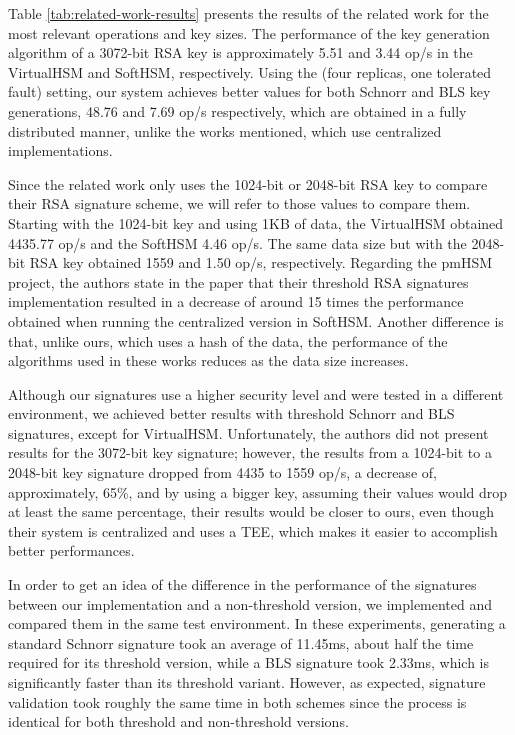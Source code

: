 Table \ref{tab:related-work-results} presents the results of the related work for the most relevant operations and key sizes. The performance of the key generation algorithm of a 3072-bit RSA key is approximately 5.51 and 3.44 op/s in the VirtualHSM and SoftHSM, respectively. Using the (four replicas, one tolerated fault) setting, our system achieves better values for both Schnorr and BLS key generations, 48.76 and 7.69 op/s respectively, which are obtained in a fully distributed manner, unlike the works mentioned, which use centralized implementations.

Since the related work only uses the 1024-bit or 2048-bit RSA key to compare their RSA signature scheme, we will refer to those values to compare them. Starting with the 1024-bit key and using 1KB of data, the VirtualHSM obtained 4435.77 op/s and the SoftHSM 4.46 op/s. The same data size but with the 2048-bit RSA key obtained 1559 and 1.50 op/s, respectively. 
Regarding the pmHSM project, the authors state in the paper \cite{pmhsm} that their threshold RSA signatures implementation resulted in a decrease of around 15 times the performance obtained when running the centralized version in SoftHSM. Another difference is that, unlike ours, which uses a hash of the data, the performance of the algorithms used in these works reduces as the data size increases. 

Although our signatures use a higher security level and were tested in a different environment, we achieved better results with threshold Schnorr and BLS signatures, except for VirtualHSM. Unfortunately, the authors did not present results for the 3072-bit key signature; however, the results from a 1024-bit to a 2048-bit key signature dropped from 4435 to 1559 op/s, a decrease of, approximately, 65\%, and by using a bigger key, assuming their values would drop at least the same percentage, their results would be closer to ours, even though their system is centralized and uses a TEE, which makes it easier to accomplish better performances.

In order to get an idea of the difference in the performance of the signatures between our implementation and a non-threshold version, we implemented and compared them in the same test environment. In these experiments, generating a standard Schnorr signature took an average of 11.45ms, about half the time required for its threshold version, while a BLS signature took 2.33ms, which is significantly faster than its threshold variant. However, as expected, signature validation took roughly the same time in both schemes since the process is identical for both threshold and non-threshold versions.

